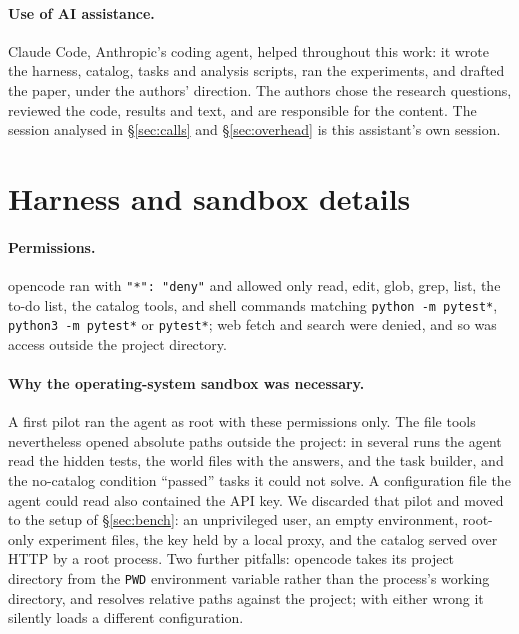 \paragraph{Use of AI assistance.} Claude Code, Anthropic's coding agent, helped throughout this work: it wrote
the harness, catalog, tasks and analysis scripts, ran the experiments, and drafted the paper, under the authors'
direction. The authors chose the research questions, reviewed the code, results and text, and are responsible
for the content. The session analysed in \S\ref{sec:calls} and \S\ref{sec:overhead} is this assistant's own
session.




\appendix
\section{Harness and sandbox details}\label{app:harness}
\paragraph{Permissions.} opencode ran with \texttt{"*": "deny"} and allowed only read, edit, glob, grep, list,
the to-do list, the catalog tools, and shell commands matching \texttt{python -m pytest*}, \texttt{python3 -m
pytest*} or \texttt{pytest*}; web fetch and search were denied, and so was access outside the project
directory.

\paragraph{Why the operating-system sandbox was necessary.} A first pilot ran the agent as root with these
permissions only. The file tools nevertheless opened absolute paths outside the project: in several runs the
agent read the hidden tests, the world files with the answers, and the task builder, and the no-catalog
condition ``passed'' tasks it could not solve. A configuration file the agent could read also contained the
API key. We discarded that pilot and moved to the setup of \S\ref{sec:bench}: an unprivileged user, an empty
environment, root-only experiment files, the key held by a local proxy, and the catalog served over HTTP by a
root process. Two further pitfalls: opencode takes its project directory from the \texttt{PWD} environment
variable rather than the process's working directory, and resolves relative paths against the project; with
either wrong it silently loads a different configuration.

